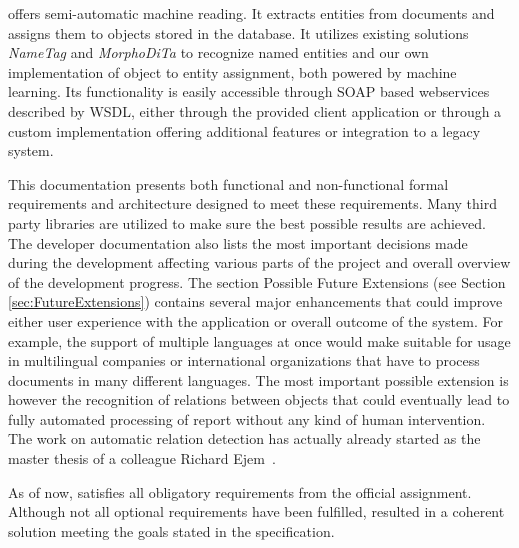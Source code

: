 \textan{} offers semi-automatic machine reading.
It extracts entities from documents and assigns them to objects
stored in the database. It utilizes existing solutions \emph{NameTag} and
\emph{MorphoDiTa} to recognize named entities and our own
implementation of object to entity assignment, both powered by machine learning.
Its functionality is easily accessible through SOAP based webservices described by
WSDL, either through the provided client application or through a custom
implementation offering additional features or integration to a legacy system.

This documentation presents both functional and non-functional formal requirements
and architecture designed to meet these requirements. Many third party libraries
are utilized to make sure the best possible results are achieved. The developer
documentation also lists the most important decisions made during the
development affecting various parts of the project and overall overview of the
development progress. The section Possible Future Extensions (see Section
\ref{sec:FutureExtensions}) contains several major enhancements that could improve
either user experience with the application or overall outcome of the system. For
example, the support of multiple languages at once would make \textan{} suitable
for usage in multilingual companies or international organizations that have to
process documents in many different languages. The most important possible
extension is however the recognition of relations between objects that could
eventually lead to fully automated processing of report without any kind of human
intervention. The work on automatic relation detection has actually already started
as the master thesis of a colleague Richard Ejem~\cite{ejem14}.

As of now, \textan{} satisfies all obligatory requirements from the official
assignment. Although not all optional requirements have been fulfilled, \textan{}
resulted in a coherent solution meeting the goals stated in the specification.

